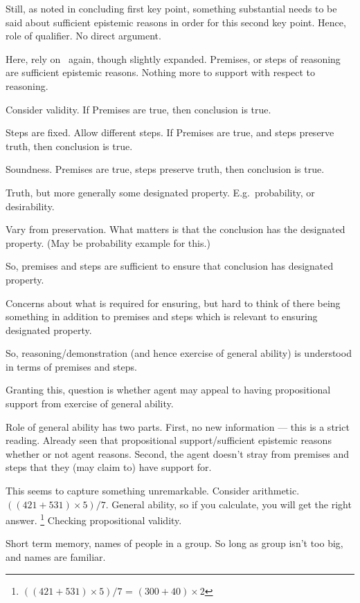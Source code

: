 \begin{note}
  Still, as noted in concluding first key point, something substantial needs to be said about sufficient epistemic reasons in order for this second key point.
  Hence, role of qualifier.
  No direct argument.

  Here, rely on~\bP{} again, though slightly expanded.
  Premises, or steps of reasoning are sufficient epistemic reasons.
  Nothing more to support with respect to reasoning.

  Consider validity.
  If Premises are true, then conclusion is true.

  Steps are fixed.
  Allow different steps.
  If Premises are true, and steps preserve truth, then conclusion is true.

  Soundness.
  Premises are true, steps preserve truth, then conclusion is true.

  Truth, but more generally some designated property.
  E.g.\ probability, or desirability.

  Vary from preservation.
  What matters is that the conclusion has the designated property.
  (May be probability example for this.)

  So, premises and steps are sufficient to ensure that conclusion has designated property.

  Concerns about what is required for ensuring, but hard to think of there being something in addition to premises and steps which is relevant to ensuring designated property.

  So, reasoning/demonstration (and hence exercise of general ability) is understood in terms of premises and steps.

  Granting this, question is whether agent may appeal to having propositional support from exercise of general ability.

  Role of general ability has two parts.
  First, no new information --- this is a strict reading.
  Already seen that propositional support/sufficient epistemic reasons whether or not agent reasons.
  Second, the agent doesn't stray from premises and steps that they (may claim to) have support for.

  This seems to capture something unremarkable.
  Consider arithmetic.
  \(((421 + 531) \times 5)/7\).
  General ability, so if you calculate, you will get the right answer.\nolinebreak
  \footnote{
    \(((421 + 531) \times 5)/7\) = \((300 + 40) \times 2\)
  }
  Checking propositional validity.

  Short term memory, names of people in a group.
  So long as group isn't too big, and names are familiar.


\end{note}
